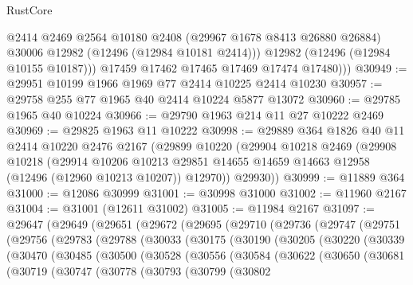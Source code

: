 \begin{lexlean}{RustCore}
\begin{coremodule}
              @2414
              @2469
              @2564
              @10180
              @2408
              (@29967 @1678 @8413 @26880 @26884)
              @30006
              @12982
              (@12496 (@12984 @10181 @2414)))
            @12982
            (@12496 (@12984 @10155 @10187)))
          @17459
          @17462
          @17465
          @17469
          @17474
          @17480)))
@30949 := @29951 @10199 @1966 @1969 @77 @2414 @10225 @2414 @10230
@30957 := @29758 @255 @77 @1965 @40 @2414 @10224 @5877 @13072
@30960 := @29785 @1965 @40 @10224
@30966 := @29790 @1963 @214 @11 @27 @10222 @2469
@30969 := @29825 @1963 @11 @10222
@30998 := @29889
    @364
    @1826
    @40
    @11
    @2414
    @10220
    @2476
    @2167
    (@29899
      @10220
      (@29904
        @10218
        @2469
        (@29908
          @10218
          (@29914
            @10206
            @10213
            @29851
            @14655
            @14659
            @14663
            @12958
            (@12496 (@12960 @10213 @10207))
            @12970))
        @29930))
@30999 := @11889 @364
@31000 := @12086 @30999
@31001 := @30998 @31000
@31002 := @11960 @2167
@31004 := @31001 (@12611 @31002)
@31005 := @11984 @2167
@31097 := @29647
    (@29649
      (@29651
        (@29672
          (@29695
            (@29710
              (@29736
                (@29747
                  (@29751
                    (@29756
                      (@29783
                        (@29788
                          (@30033
                            (@30175
                              (@30190
                                (@30205
                                  (@30220
                                    (@30339
                                      (@30470
                                        (@30485
                                          (@30500
                                            (@30528
                                              (@30556
                                                (@30584
                                                  (@30622
                                                    (@30650
                                                      (@30681
                                                        (@30719
                                                          (@30747
                                                            (@30778
                                                              (@30793
                                                                (@30799
                                                                  (@30802

\end{coremodule}
\end{lexlean}
